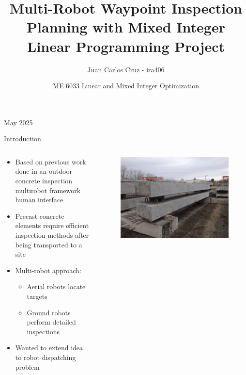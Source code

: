 \documentclass[aspectratio=169,11pt,xcolor={dvipsnames},hyperref={pdftex,pdfpagemode=UseNone,hidelinks,pdfdisplaydoctitle=true},usepdftitle=false]{beamer}
\title{Multi-Robot Waypoint Inspection Planning with Mixed Integer Linear Programming Project}
\author{Juan Carlos Cruz - ira406}
\date{ME 6033 Linear and Mixed Integer Optimization}
\begin{document}
    
    \begin{frame}
      \titlepage
      May 2025
    \end{frame}
    
    \begin{frame}{Introduction}
      \begin{columns}[c]
        \begin{column}{0.58\textwidth}
          \begin{itemize}
            \item Based on previous work done in an outdoor concrete inspection multirobot framework human interface
            \item Precast concrete elements require efficient inspection methods after being transported to a site
            \item Multi-robot approach:
              \begin{itemize}
                \item Aerial robots locate targets
                \item Ground robots perform detailed inspections
              \end{itemize}
            \item Wanted to extend idea to robot dispatching problem
          \end{itemize}
          
        \end{column}

        \begin{column}{0.40\textwidth}

          \begin{figure}
            \centering
            \includegraphics[scale=0.3]{figures/concrete.pdf}
          \end{figure}
              
        \end{column}
      \end{columns}

    \end{frame}
\end{document}
